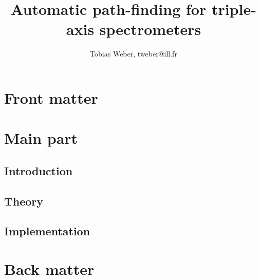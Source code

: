 \documentclass[english]{book}
\begin{document}
\newcommand{\ill}{Institut Laue-Langevin (ILL), 71 avenue des Martyrs, CS 20156, 38042 Grenoble cedex 9, France}
\newcommand{\fuh}{Fernuniversit\"at in Hagen (FUH), Universit\"atsstraße 47, 58097 Hagen, Germany}


\title{Automatic path-finding for triple-axis spectrometers}
\author{Tobias Weber, tweber@ill.fr}

\maketitle
\tableofcontents




\part{Front matter}




\part{Main part}

\chapter{Introduction}


\chapter{Theory}




\chapter{Implementation}


\appendix
\part{Back matter}





\end{document}
